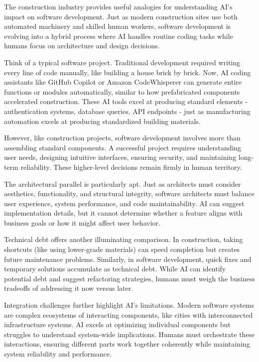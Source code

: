 \documentclass[
  Letterpaper,
]{scrbook}
\begin{document}
The construction industry provides useful analogies for understanding
AI's impact on software development. Just as modern construction sites
use both automated machinery and skilled human workers, software
development is evolving into a hybrid process where AI handles routine
coding tasks while humans focus on architecture and design decisions.

Think of a typical software project. Traditional development required
writing every line of code manually, like building a house brick by
brick. Now, AI coding assistants like GitHub Copilot or
Amazon CodeWhisperer can generate entire
functions or modules automatically, similar to how prefabricated
components accelerated construction. These AI tools excel at producing
standard elements - authentication systems, database queries, API
endpoints - just as manufacturing automation excels
at producing standardized building materials.

However, like construction projects, software development involves more
than assembling standard components. A successful project requires
understanding user needs, designing intuitive interfaces, ensuring
security, and maintaining long-term reliability. These higher-level
decisions remain firmly in human territory.

The architectural parallel is particularly apt. Just as architects must
consider aesthetics, functionality, and structural integrity, software
architects must balance user experience, system performance, and code
maintainability. AI can suggest implementation details, but it cannot
determine whether a feature aligns with business goals or how it might
affect user behavior.

Technical debt offers another illuminating comparison. In construction,
taking shortcuts (like using lower-grade materials) can speed completion
but creates future maintenance problems. Similarly, in software
development, quick fixes and temporary solutions accumulate as technical
debt. While AI can identify potential debt and suggest refactoring
strategies, humans must weigh the business tradeoffs of addressing it
now versus later.

Integration challenges further highlight AI's limitations. Modern
software systems are complex ecosystems of interacting components, like
cities with interconnected infrastructure systems. AI excels at
optimizing individual components but struggles to understand system-wide
implications. Humans must orchestrate these interactions, ensuring
different parts work together coherently while maintaining system
reliability and performance.
\end{document}
